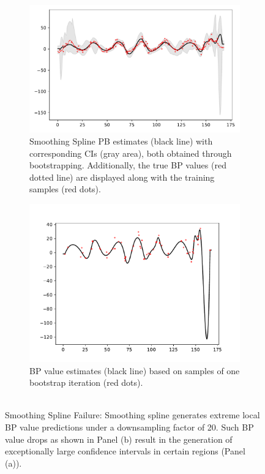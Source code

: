 \begin{figure}[!htb]
\centering
\begin{subfigure}{.5\textwidth}
    \centering
    \includegraphics[width=\linewidth]{Pictures/spline_extreme/plot_posterior_confint_spline}
    \caption{Smoothing Spline PB estimates (black line) with corresponding CIs (gray area),
        both obtained through bootstrapping.
        Additionally, the true BP values (red dotted line) are displayed along
        with the training samples (red dots).}
\end{subfigure}\hfill
\begin{subfigure}{.42\textwidth}
    \centering
    \includegraphics[width=\linewidth]{Pictures/spline_extreme/plot_pred_bootstrap_spline_reg_v2_70}
  \caption[Estimate Single Bootstrap Sample]{
      BP value estimates (black line) based on samples of one bootstrap iteration (red dots).
      \\
        \\}
    \label{subfig:ex-spline-failure-bootstrap}
\end{subfigure}
\caption[Smoothing Spline Failure]{
    Smoothing Spline Failure:
    Smoothing spline generates extreme local BP value predictions
    under a downsampling factor of 20.
    Such BP value drops as shown in Panel (b) result in
    the generation of exceptionally
    large confidence intervals in certain regions (Panel (a)).}
\label{fig:ex-spline-failure}
\end{figure}






